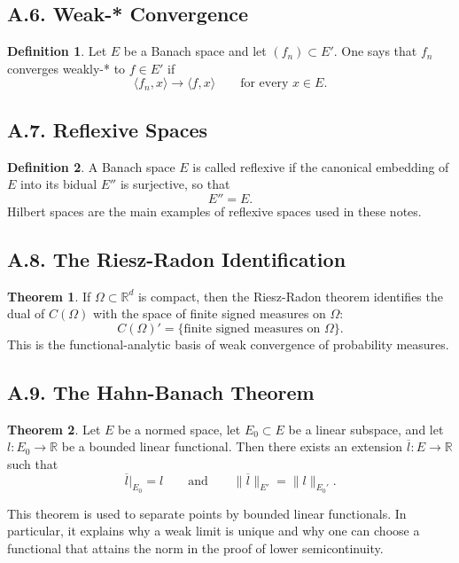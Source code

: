 \documentclass[11pt]{article}
\theoremstyle{definition}
\newtheorem{definition}{Definition}
\newtheorem{theorem}{Theorem}
\theoremstyle{remark}
\begin{document}
\subsection*{A.6. Weak-* Convergence}
\begin{definition}
Let \(E\) be a Banach space and let \((f_n)\subset E'\). One says that \(f_n\) converges weakly-* to \(f\in E'\) if
\[
\langle f_n,x\rangle\to \langle f,x\rangle
\qquad \text{for every } x\in E.
\]
\end{definition}

\subsection*{A.7. Reflexive Spaces}
\begin{definition}
A Banach space \(E\) is called reflexive if the canonical embedding of \(E\) into its bidual \(E''\) is surjective, so that
\[
E''=E.
\]
Hilbert spaces are the main examples of reflexive spaces used in these notes.
\end{definition}

\subsection*{A.8. The Riesz-Radon Identification}
\begin{theorem}
If \(\Omega\subset \mathbb R^d\) is compact, then the Riesz-Radon theorem identifies the dual of \(C(\Omega)\) with the space of finite signed measures on \(\Omega\):
\[
C(\Omega)'=\{\text{finite signed measures on }\Omega\}.
\]
This is the functional-analytic basis of weak convergence of probability measures.
\end{theorem}

\subsection*{A.9. The Hahn-Banach Theorem}
\begin{theorem}
Let \(E\) be a normed space, let \(E_0\subset E\) be a linear subspace, and let \(l:E_0\to \mathbb R\) be a bounded linear functional. Then there exists an extension \(\overline l:E\to \mathbb R\) such that
\[
\overline l|_{E_0}=l
\qquad \text{and} \qquad
\|\overline l\|_{E'}=\|l\|_{E_0'}.
\]
\end{theorem}
This theorem is used to separate points by bounded linear functionals. In particular, it explains why a weak limit is unique and why one can choose a functional that attains the norm in the proof of lower semicontinuity.
\end{document}
